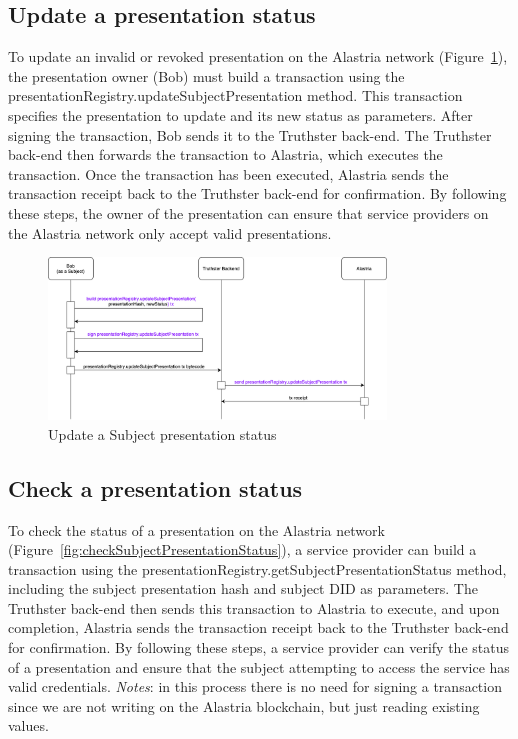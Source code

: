 \documentclass[target=mst,aauheader=]{thud}
\begin{document}
\subsection{Update a presentation status}

To update an invalid or revoked presentation on the Alastria network (Figure~\ref{fig:updateSubjectPresentation}), the presentation owner (Bob) must build a transaction using the presentationRegistry.updateSubjectPresentation method. This transaction specifies the presentation to update and its new status as parameters. After signing the transaction, Bob sends it to the Truthster back-end. The Truthster back-end then forwards the transaction to Alastria, which executes the transaction. Once the transaction has been executed, Alastria sends the transaction receipt back to the Truthster back-end for confirmation. By following these steps, the owner of the presentation can ensure that service providers on the Alastria network only accept valid presentations.

\begin{figure}
    \centering
    \includegraphics[width=0.8\textwidth]{images/updateSubjectPresentation.png}
    \caption{Update a Subject presentation status}
    \label{fig:updateSubjectPresentation}
\end{figure}

\subsection{Check a presentation status}

To check the status of a presentation on the Alastria network (Figure~\ref{fig:checkSubjectPresentationStatus}), a service provider can build a transaction using the presentationRegistry.getSubjectPresentationStatus method, including the subject presentation hash and subject DID as parameters. The Truthster back-end then sends this transaction to Alastria to execute, and upon completion, Alastria sends the transaction receipt back to the Truthster back-end for confirmation. By following these steps, a service provider can verify the status of a presentation and ensure that the subject attempting to access the service has valid credentials.
\textit{Notes}: in this process there is no need for signing a transaction since we are not writing on the Alastria blockchain, but just reading existing values.
\end{document}
